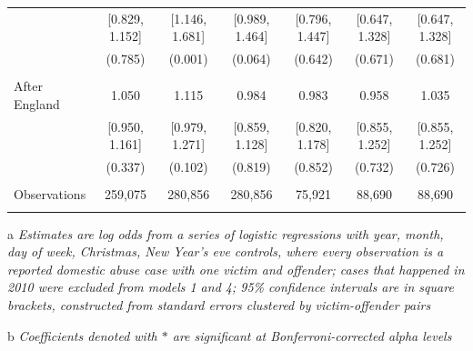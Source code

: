 \documentclass[12pt, a4paper]{article}
\begin{document}
\begin{table}
{\begin{threeparttable}
\begin{tabular}{@{\extracolsep{5pt}}lcccccc}
  & [0.829, 1.152] & [1.146, 1.681] & [0.989, 1.464] & [0.796, 1.447] & [0.647, 1.328] & [0.647, 1.328] \\ 
  & (0.785) & (0.001) & (0.064) & (0.642) & (0.671) & (0.681) \\ 
  & & & & & & \\ 
 After England & 1.050 & 1.115 & 0.984 & 0.983 & 0.958 & 1.035 \\ 
  & [0.950, 1.161] & [0.979, 1.271] & [0.859, 1.128] & [0.820, 1.178] & [0.855, 1.252] & [0.855, 1.252] \\ 
  & (0.337) & (0.102) & (0.819) & (0.852) & (0.732) & (0.726) \\


\hline \\[-1.8ex] 
Observations & 259,075 & 280,856 & 280,856 & 75,921 & 88,690 & 88,690 \\   
\hline 
\hline \\[-1.8ex] 
\end{tabular} 
\begin{tablenotes}
      \item[a] \textit{Estimates are log odds from a series of logistic regressions with year, month, day of week, Christmas, New Year's eve controls, where every observation is a reported domestic abuse case with one victim and offender; cases that happened in 2010 were excluded from models 1 and 4; 95\% confidence intervals are in square brackets, constructed from standard errors clustered by victim-offender pairs}
                         \item[b] \textit{Coefficients denoted with $*$ are significant at Bonferroni-corrected alpha levels}
    \end{tablenotes}
\end{threeparttable}   }
\end{table}
\end{document}
